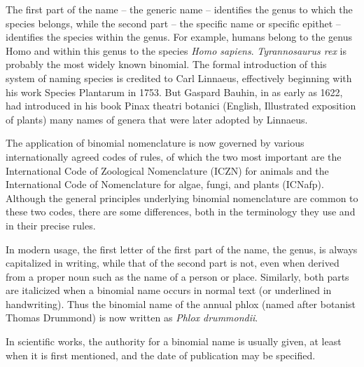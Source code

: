 The first part of the name -- the generic name -- identifies the genus to which the species belongs, while the second part -- the specific name or specific epithet -- identifies the species within the genus. For example, humans belong to the genus Homo and within this genus to the species \emph{Homo sapiens}. \emph{Tyrannosaurus rex} is probably the most widely known binomial. The formal introduction of this system of naming species is credited to Carl Linnaeus, effectively beginning with his work Species Plantarum in 1753. But Gaspard Bauhin, in as early as 1622, had introduced in his book Pinax theatri botanici (English, Illustrated exposition of plants) many names of genera that were later adopted by Linnaeus.

The application of binomial nomenclature is now governed by various internationally agreed codes of rules, of which the two most important are the International Code of Zoological Nomenclature (ICZN) for animals and the International Code of Nomenclature for algae, fungi, and plants (ICNafp). Although the general principles underlying binomial nomenclature are common to these two codes, there are some differences, both in the terminology they use and in their precise rules.

In modern usage, the first letter of the first part of the name, the genus, is always capitalized in writing, while that of the second part is not, even when derived from a proper noun such as the name of a person or place. Similarly, both parts are italicized when a binomial name occurs in normal text (or underlined in handwriting). Thus the binomial name of the annual phlox (named after botanist Thomas Drummond) is now written as \emph{Phlox drummondii}.

In scientific works, the authority for a binomial name is usually given, at least when it is first mentioned, and the date of publication may be specified.

